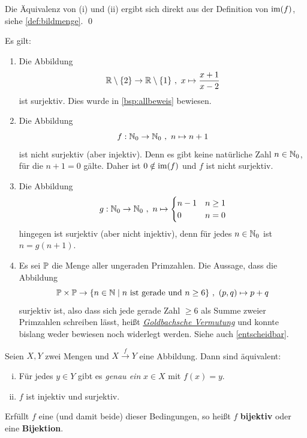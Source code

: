 \begin{bew}
    Die Äquivalenz von (i) und (ii) ergibt sich direkt aus der Definition von $\operatorname{im}(f)$, siehe \cref{def:bildmenge}. \qed
\end{bew}


\begin{bsp} \label{bsp:surjektiv}
    Es gilt:
    \begin{enumerate}
        \item Die Abbildung
            \[ \mathbb R \setminus \{2\} \to \mathbb R \setminus \{1\} \ ,\ x \mapsto \frac{x+1}{x-2} \]
        ist surjektiv. Dies wurde in \cref{bsp:allbeweis} bewiesen.
        \item Die Abbildung
            \[ f:\mathbb N_0 \to \mathbb N_0 \ ,\ n \mapsto n+1 \]
        ist nicht surjektiv (aber injektiv). Denn es gibt keine natürliche Zahl $n\in \mathbb N_0$, für die $n+1=0$ gälte. Daher ist $0\notin \operatorname{im}(f)$ und $f$ ist nicht surjektiv.
        \item Die Abbildung
            \[ g: \mathbb N_0 \to \mathbb N_0\ ,\ n \mapsto \begin{cases}
                n-1 & n\ge 1 \\
                0 & n=0
            \end{cases}\]
        hingegen ist surjektiv (aber nicht injektiv), denn für jedes $n \in \mathbb N_0$ ist $n=g(n+1)$.
        \item Es sei $\mathbb P$ die Menge aller ungeraden Primzahlen. Die Aussage, dass die Abbildung
            \[ \mathbb P \times \mathbb P \to \{n\in \mathbb N \mid n\ \text{ist gerade und}\ n\ge 6\} \ ,\ (p,q) \mapsto p+q \]
        surjektiv ist, also dass sich jede gerade Zahl $\ge 6$ als Summe zweier Primzahlen schreiben lässt, heißt \href{https://de.wikipedia.org/wiki/Goldbachsche_Vermutung}{\emph{Goldbachsche Vermutung}} und konnte bislang weder bewiesen noch widerlegt werden. Siehe auch \cref{entscheidbar}.
    \end{enumerate}
\end{bsp}


\begin{de} \label{def:bijektiv} 
    Seien $X,Y$ zwei Mengen und $X\xrightarrow{f} Y$ eine Abbildung. Dann sind äquivalent:
    \begin{enumerate}[(i)]
        \item Für jedes $y\in Y$ gibt es \emph{genau ein} $x\in X$ mit $f(x)=y$.
        \item $f$ ist injektiv und surjektiv.
    \end{enumerate}
    Erfüllt $f$ eine (und damit beide) dieser Bedingungen, so heißt $f$ \textbf{bijektiv} oder eine \textbf{Bijektion}.
\end{de}



